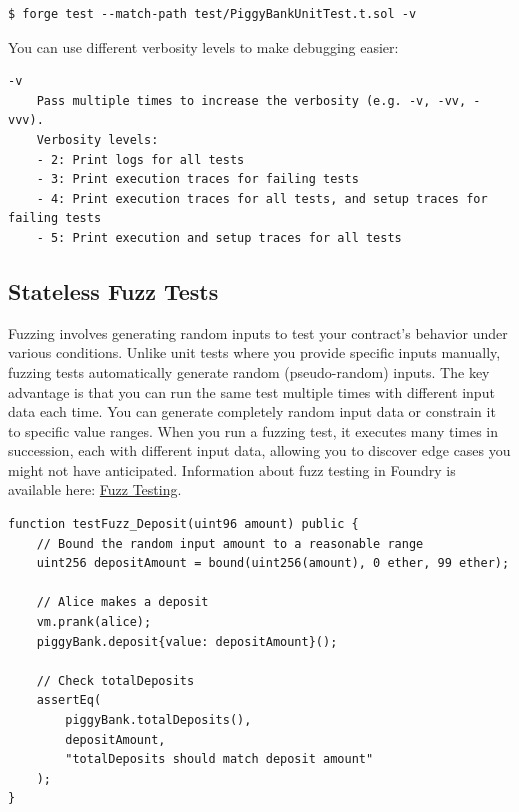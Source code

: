 \documentclass[12pt]{article}
\begin{document}
\noindent \begin{minipage}{\textwidth}
    \begin{verbatim}
$ forge test --match-path test/PiggyBankUnitTest.t.sol -v
\end{verbatim}
\end{minipage}

\noindent
You can use different verbosity levels to make debugging easier:

\noindent \begin{minipage}{\textwidth}
    \begin{verbatim}
-v
    Pass multiple times to increase the verbosity (e.g. -v, -vv, -vvv).
    Verbosity levels:
    - 2: Print logs for all tests
    - 3: Print execution traces for failing tests
    - 4: Print execution traces for all tests, and setup traces for failing tests
    - 5: Print execution and setup traces for all tests
\end{verbatim}
\end{minipage}

\subsection{Stateless Fuzz Tests}
Fuzzing involves generating random inputs to test your contract's behavior
under various conditions. Unlike unit tests where you provide specific inputs
manually, fuzzing tests automatically generate random (pseudo-random) inputs.
The key advantage is that you can run the same test multiple times with
different input data each time. You can generate completely random input data
or constrain it to specific value ranges. When you run a fuzzing test, it
executes many times in succession, each with different input data, allowing you
to discover edge cases you might not have anticipated. Information about fuzz
testing in Foundry is available here:
\href{https://book.getfoundry.sh/forge/fuzz-testing}{Fuzz Testing}.

\noindent \begin{minipage}{\textwidth}
    \begin{lstlisting}[language=Solidity]
function testFuzz_Deposit(uint96 amount) public {
    // Bound the random input amount to a reasonable range
    uint256 depositAmount = bound(uint256(amount), 0 ether, 99 ether);
    
    // Alice makes a deposit
    vm.prank(alice);
    piggyBank.deposit{value: depositAmount}();
    
    // Check totalDeposits
    assertEq(
        piggyBank.totalDeposits(),
        depositAmount,
        "totalDeposits should match deposit amount"
    );
}
\end{lstlisting}
\end{minipage}
\end{document}
